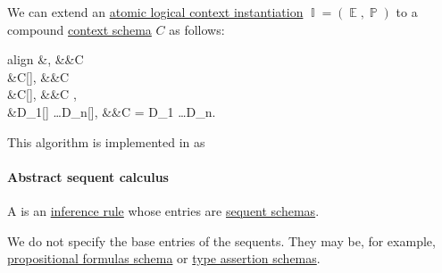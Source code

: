 \begin{algorithm}\label{alg:logical_context_instantiation}
  We can extend an \hyperref[def:atomic_context_instantiation]{atomic logical context instantiation} \( \BbbI = (\BbbE, \BbbP) \) to a compound \hyperref[def:logical_context_schema]{context schema} \( C \) as follows:
  \begin{empheq}[left={C[\BbbI]} \coloneqq \empheqlbrace]{align}
    &\bnfves,                      &&C                   \label{eq:alg:logical_context_instantiation/empty} \\
    &C[\BbbE],                     &&C                \label{eq:alg:logical_context_instantiation/entry} \\
    &C[\BbbP],                     &&C , \label{eq:alg:logical_context_instantiation/placeholder} \\
    &D_1[\BbbI] \ldots D_n[\BbbI], &&C = D_1 \ldots D_n.             \label{eq:alg:logical_context_instantiation/list}
  \end{empheq}
\end{algorithm}
\begin{comments}
  \item This algorithm is implemented in \cite{notebook:code} as
  \begin{CodeRefDisplay}
  \end{CodeRefDisplay}
\end{comments}

\paragraph{Abstract sequent calculus}

\begin{definition}\label{def:sequent_calculus_rule}\mimprovised
  A  is an \hyperref[def:inference_rule]{inference rule} whose entries are \hyperref[def:sequent_schema]{sequent schemas}.
\end{definition}
\begin{comments}
  \item We do not specify the base entries of the sequents. They may be, for example, \hyperref[def:propositional_formula_schema]{propositional formulas schema} or \hyperref[def:type_assertion]{type assertion schemas}.
\end{comments}

